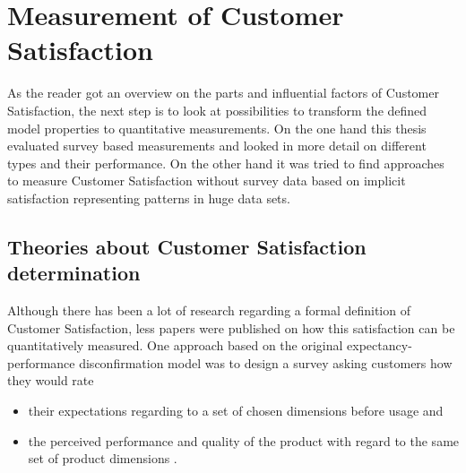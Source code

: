 \section{Measurement of Customer Satisfaction}
As the reader got an overview on the parts and influential factors of Customer Satisfaction, the next step is to look at possibilities to transform the defined model properties to quantitative measurements. On the one hand this thesis evaluated survey based measurements and looked in more detail on different types and their performance. On the other hand it was tried to find approaches to measure Customer Satisfaction without survey data based on implicit satisfaction representing patterns in huge data sets. 

\subsection{Theories about Customer Satisfaction determination}
Although there has been a lot of research regarding a formal definition of Customer Satisfaction, less papers were published on how this satisfaction can be quantitatively measured. One approach based on the original expectancy-performance disconfirmation model was to design a survey asking customers how they would rate

\begin{itemize}
	\item their expectations regarding to a set of chosen dimensions before usage and
	\item the perceived performance and quality of the product with regard to the same set of product dimensions \cite{prakash1983reliability}.
\end{itemize}

